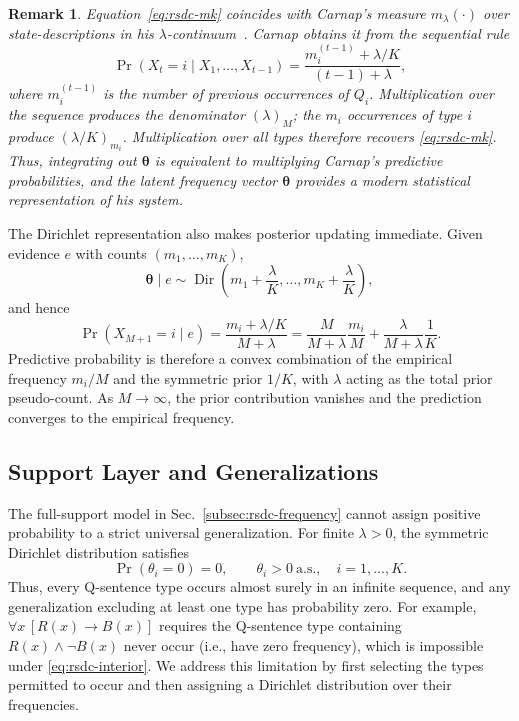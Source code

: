 \documentclass[10pt, conference, letterpaper]{ IEEEtran}
\theoremstyle{bfnote}
\newtheorem{remark}{Remark}
\begin{document}
\begin{remark}
Equation~\eqref{eq:rsdc-mk} coincides with Carnap's measure
$m_{\lambda}(\cdot)$ over state-descriptions in his $\lambda$-continuum~\cite{c1}. Carnap obtains it from the
sequential rule
\begin{equation}
\label{eq:rsdc-carnaprule}
\Pr(X_t=i\mid X_1,\ldots,X_{t-1})
=
\frac{m_i^{(t-1)}+\lambda/K}
     {(t-1)+\lambda},
\end{equation}
where $m_i^{(t-1)}$ is the number of previous occurrences of $Q_i$.
Multiplication over the sequence produces the denominator
$(\lambda)_M$; the $m_i$ occurrences of type $i$ produce
$(\lambda/K)_{m_i}$. Multiplication over all types therefore recovers
\eqref{eq:rsdc-mk}. Thus, integrating out
$\boldsymbol{\theta}$ is equivalent to multiplying Carnap's predictive
probabilities, and the latent frequency vector $\boldsymbol{\theta}$ provides a modern
statistical representation of his system.
\end{remark}

The Dirichlet representation also makes posterior updating immediate.
Given evidence $e$ with counts $(m_1,\ldots,m_K)$,
\begin{equation}
\label{eq:rsdc-conj}
\boldsymbol{\theta}\mid e
\sim
\operatorname{Dir}\!\left(
m_1+\frac{\lambda}{K},\ldots,
m_K+\frac{\lambda}{K}
\right),
\end{equation}
and hence
\begin{equation}
\label{eq:rsdc-pred}
\Pr(X_{M+1}=i\mid e)
=
\frac{m_i+\lambda/K}{M+\lambda}
=
\frac{M}{M+\lambda}\frac{m_i}{M}
+
\frac{\lambda}{M+\lambda}\frac{1}{K}.
\end{equation}
Predictive probability is therefore a convex combination of the
empirical frequency $m_i/M$ and the symmetric prior $1/K$, with $\lambda$
acting as the total prior pseudo-count. As $M\rightarrow\infty$, the prior
contribution vanishes and the prediction converges to the empirical
frequency.

\subsection{Support Layer and Generalizations}
\label{subsec:rsdc-support}
\label{subsec:rsdc-gen}

The full-support model in Sec.~\ref{subsec:rsdc-frequency} cannot assign
positive probability to a strict universal generalization. For finite
$\lambda>0$, the symmetric Dirichlet distribution satisfies
\begin{equation}
\label{eq:rsdc-interior}
\Pr(\theta_i=0)=0,\qquad \theta_i>0\ \text{a.s.},\quad i=1,\ldots,K.
\end{equation}
Thus, every Q-sentence type occurs almost surely in an infinite sequence,
and any generalization excluding at least one type has probability zero.
For example, $\forall x\,[R(x)\rightarrow B(x)]$ requires the Q-sentence type
containing $R(x)\land\neg B(x)$ never occur (i.e., have zero frequency), which is impossible under
\eqref{eq:rsdc-interior}. We address this limitation by first selecting the
types permitted to occur and then assigning a Dirichlet distribution over
their frequencies.
\end{document}
